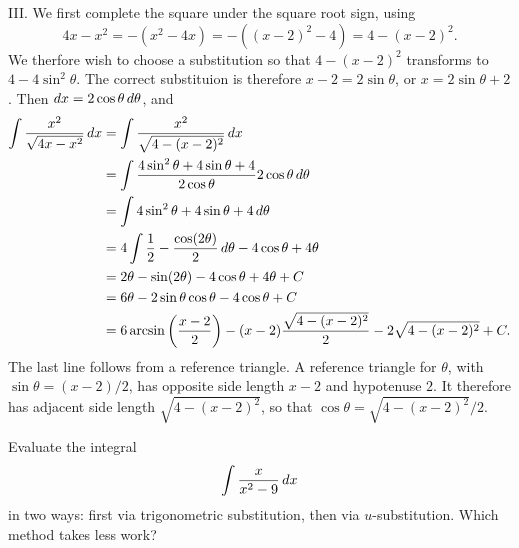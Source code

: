 \documentclass[]{ximera}
\begin{document}
\begin{freeResponse}
III. We first complete the square under the square root sign, using 
$$
4x-x^2 = -(x^2-4x) = -((x-2)^2-4) = 4-(x-2)^2.
$$
We therfore wish to choose a substitution so that $4-(x-2)^2$ transforms to $4-4\sin^2\theta$. The correct substituion is therefore $x-2 = 2 \sin \theta$, or $x= 2 \sin \theta + 2$. Then $\mathop{}\!d x = 2 \cos \theta \mathop{}\!d \theta$, and 
\begin{align*}
\int \frac{x^2}{\sqrt{4x-x^2}} \mathop{}\!d x & = \int \frac{x^2}{\sqrt{4-(x-2)^2}} \mathop{}\!d x \\
&= \int \frac{4 \sin^2 \theta + 4 \sin \theta + 4}{2 \cos \theta} 2 \cos \theta \mathop{}\!d \theta \\
&= \int 4 \sin^2 \theta + 4 \sin \theta + 4 \mathop{}\!d \theta \\
&= 4 \int \frac{1}{2} - \frac{\cos (2 \theta)}{2} \mathop{}\!d \theta -4 \cos \theta + 4 \theta \\
&= 2 \theta - \sin (2 \theta) - 4 \cos \theta + 4 \theta + C \\
&= 6 \theta - 2 \sin \theta \cos \theta - 4 \cos \theta + C \\
&= 6 \arcsin \left(\frac{x-2}{2}\right) - (x-2)\frac{\sqrt{4-(x-2)^2}}{2} - 2 \sqrt{4-(x-2)^2} + C.
\end{align*}
The last line follows from a reference triangle. A reference triangle for $\theta$, with $\sin \theta = (x-2)/2$, has opposite side length $x-2$ and hypotenuse $2$. It therefore has adjacent side length $\sqrt{4-(x-2)^2}$, so that $\cos \theta = \sqrt{4-(x-2)^2}/2$.
\end{freeResponse}

\begin{problem}
Evaluate the integral
$$
\int \frac{x}{x^2-9} \mathop{}\!d x
$$
in two ways: first via trigonometric substitution, then via $u$-substitution. Which method takes less work?
\end{problem}
\end{document}
